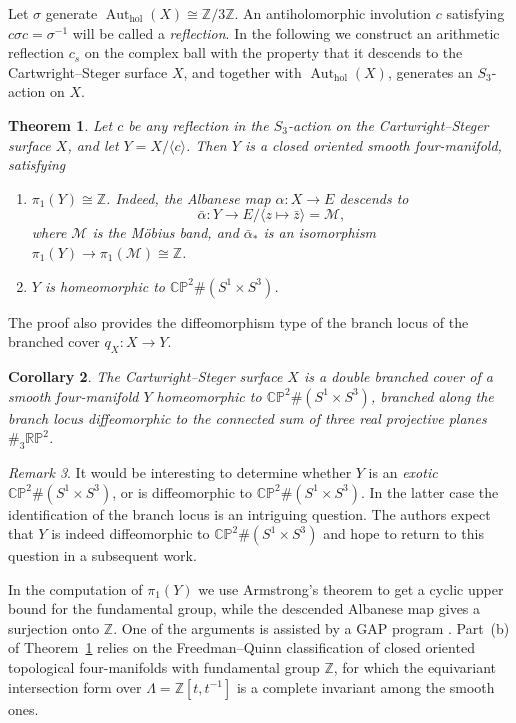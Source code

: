 \documentclass[11pt]{amsart}
\newtheorem{theorem}{Theorem}[section]
\newtheorem{corollary}[theorem]{Corollary}
\theoremstyle{definition}
\theoremstyle{remark}
\newtheorem{remark}[theorem]{Remark}
\newcommand{\Z}{\mathbb Z}
\newcommand{\CP}{\mathbb{CP}}
\newcommand{\RP}{\mathbb{RP}}
\newcommand{\Aut}{\operatorname{Aut}}
\begin{document}
Let $\sigma$ generate $\Aut_{\mathrm{hol}}(X)\cong\Z/3\Z$.  An
antiholomorphic involution $c$ satisfying
$c\sigma c=\sigma^{-1}$ will be called a \emph{reflection}.  In the
following we construct an
arithmetic reflection $c_s$ on the complex ball with the property that
it descends to the Cartwright--Steger surface $X$, and together with
$\Aut_{\mathrm{hol}}(X)$, generates an $S_3$-action on $X$.

\begin{theorem}\label{thm:main}
Let $c$ be any reflection in the $S_3$-action on the
Cartwright--Steger surface $X$, and let $Y=X/\langle c\rangle$.  Then $Y$ is
a closed oriented smooth four-manifold, satisfying
\begin{enumerate}[label=\textup{(\alph*)}]
\item $\pi_1(Y)\cong\mathbb Z$.  Indeed, the Albanese map
  $\alpha \colon X\to E$ descends to
      \[
       \bar\alpha\colon Y\longrightarrow E/\langle z\mapsto\bar z\rangle ={\mathcal {M}},
      \]
where ${\mathcal {M}}$ is the M\"obius band, and $\bar\alpha_*$ is an
isomorphism $\pi _1(Y)\to \pi _1 ({\mathcal   {M}})\cong \Z$.
      
\item $Y$ is homeomorphic to $\CP^2\#(S^1\times S^3)$.
\end{enumerate}
\end{theorem}
The proof also provides the diffeomorphism type of the branch locus of the
branched cover $q_X\colon X\to Y$.

\begin{corollary}\label{cor:branched-cover}
The Cartwright--Steger surface $X$ is a double branched cover of a smooth
four-manifold $Y$ homeomorphic to $\CP^2\#(S^1\times S^3)$, branched along the
branch locus  diffeomorphic to the connected sum of three
real projective planes $\# _3 \RP ^2$.
\end{corollary}

\begin{remark}\label{rem:exotic}
It would be interesting to determine whether $Y$ is an \emph{exotic}
$\CP^2\#(S^1\times S^3)$, or is diffeomorphic to
$\CP^2\#(S^1\times S^3)$.  In the latter case the identification of the
branch locus is an intriguing question. The authors expect that $Y$ is
indeed diffeomorphic to $\CP ^2\# (S^1\times S^3)$ and hope to return
to this question in a subsequent work.
\end{remark}

In the computation of $\pi_1(Y)$ we use Armstrong's theorem
\cite{Armstrong} to get a cyclic upper bound for the fundamental
group, while the descended Albanese map gives a surjection onto
$\mathbb Z$.  One of the arguments is assisted by a \textsf{GAP}
program \cite{GAP4}.  Part~(b) of Theorem~\ref{thm:main} relies on the
Freedman--Quinn classification of closed oriented topological
four-manifolds with fundamental group $\Z$, for which the equivariant
intersection form over $\Lambda=\Z[t,t^{-1}]$ is a complete invariant
among the smooth ones.
\end{document}
